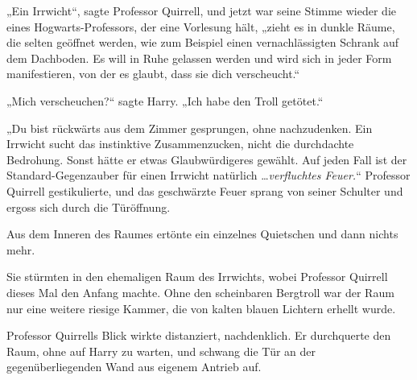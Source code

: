 „Ein Irrwicht“, sagte Professor Quirrell, und jetzt war seine Stimme wieder die eines Hogwarts-Professors, der eine Vorlesung hält, „zieht es in dunkle Räume, die selten geöffnet werden, wie zum Beispiel einen vernachlässigten Schrank auf dem Dachboden. Es will in Ruhe gelassen werden und wird sich in jeder Form manifestieren, von der es glaubt, dass sie dich verscheucht.“

„Mich verscheuchen?“ sagte Harry. „Ich habe den Troll getötet.“

„Du bist rückwärts aus dem Zimmer gesprungen, ohne nachzudenken. Ein Irrwicht sucht das instinktive Zusammenzucken, nicht die durchdachte Bedrohung. Sonst hätte er etwas Glaubwürdigeres gewählt. Auf jeden Fall ist der Standard-Gegenzauber für einen Irrwicht natürlich …\emph{verfluchtes Feuer.}“
Professor Quirrell gestikulierte, und das geschwärzte Feuer sprang von seiner Schulter und ergoss sich durch die Türöffnung.

Aus dem Inneren des Raumes ertönte ein einzelnes Quietschen und dann nichts mehr.

Sie stürmten in den ehemaligen Raum des Irrwichts, wobei Professor Quirrell dieses Mal den Anfang machte. Ohne den scheinbaren Bergtroll war der Raum nur eine weitere riesige Kammer, die von kalten blauen Lichtern erhellt wurde.

Professor Quirrells Blick wirkte distanziert, nachdenklich. Er durchquerte den Raum, ohne auf Harry zu warten, und schwang die Tür an der gegenüberliegenden Wand aus eigenem Antrieb auf.

